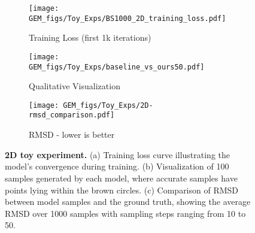 \begin{figure}[H]
    \centering
    \begin{subfigure}[b]{0.32\textwidth} %
        \centering
        \texttt{[image: GEM\_figs/Toy\_Exps/BS1000\_2D\_training\_loss.pdf]}
        \caption{Training Loss (first 1k iterations)}
        \label{fig:training_loss_2D}
    \end{subfigure}
    \hfill
    \begin{subfigure}[b]{0.32\textwidth} %
        \centering
    \texttt{[image: GEM\_figs/Toy\_Exps/baseline\_vs\_ours50.pdf]}
        \caption{Qualitative Visualization}
        \label{fig:2D-qualitative}
    \end{subfigure}
    \hfill
    \begin{subfigure}[b]{0.32\textwidth} %
        \centering
    \texttt{[image: GEM\_figs/Toy\_Exps/2D-rmsd\_comparison.pdf]}
        \caption{RMSD - lower is better}
        \label{fig:2D-rmsd}
    \end{subfigure}
    \caption{\textbf{2D toy experiment.} (a) Training loss curve illustrating the model's convergence during training. (b) Visualization of 100 samples generated by each model, where accurate samples have points lying within the brown circles. (c) Comparison of RMSD between model samples and the ground truth, showing the average RMSD over 1000 samples with sampling steps ranging from 10 to 50.}
    \label{fig:2D-toy}
\end{figure}